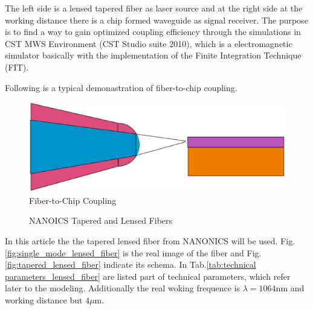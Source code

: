 The left side is a lensed tapered fiber as laser source and at the right side at the working distance there is a chip formed waveguide as signal receiver.  The purpose is to find a way to gain optimized coupling efficiency through the simulations in CST MWS Environment (CST Studio suite 2010), which is a electromagnetic simulator basically with the implementation of the Finite Integration Technique (FIT)\cite{ cst_help_siulation_method}. 


Following is a typical demonastration of fiber-to-chip coupling.
\begin{figure}
\includegraphics[width=.7\textwidth]{bilder/experiment_object}
\caption{Fiber-to-Chip Coupling}
\label{fig:experiment_object}
\end{figure}

\begin{figure}
\centering
{}
\hfill
{}
\label{fig:TLFs}
\caption{NANOICS Tapered and Lensed Fibers}
\end{figure}


In this article the the tapered lensed fiber from NANONICS\cite{nanoscal_tapered_fiber} will be used. Fig.\quad\ref{fig:single_mode_lensed_fiber} is the real image of the fiber and Fig.\quad\ref{fig:tapered_lensed_fiber} indicate its schema. In Tab.\quad\ref{tab:technical parameters_lensed_fiber} are listed part of technical parameters, which refer later to the modeling. Additionally the real woking frequence is $\lambda=1064$nm and working distance but $4\mu$m. 


